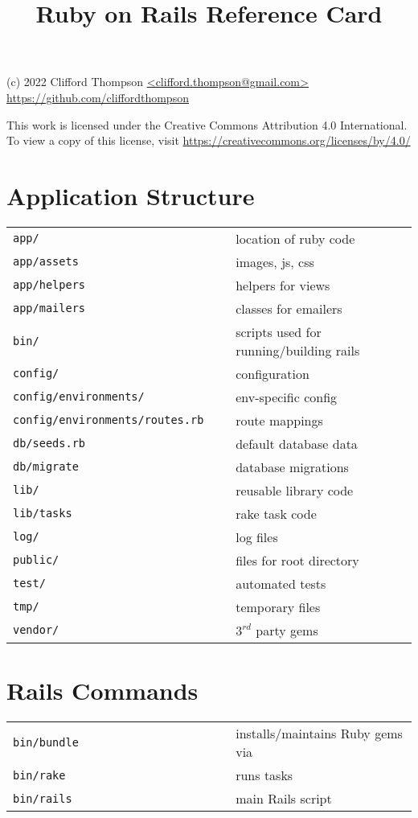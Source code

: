 \documentclass[6pt]{article}
\begin{document}
\raggedright
\footnotesize
\begin{multicols}{3}

  \title{Ruby on Rails Reference Card}

  {\scriptsize
    (c) 2022 Clifford Thompson \url{<clifford.thompson@gmail.com>}\\
    \url{https://github.com/cliffordthompson}

    This work is licensed under the Creative Commons Attribution 4.0 International.
    To view a copy of this license, visit
    \url{https://creativecommons.org/licenses/by/4.0/}
  }

  \section{Application Structure}
  \begin{tabular}{L{0.55\linewidth} L{0.45\linewidth}}
    \tt app/ & location of ruby code \\
    \tt app/assets &  images, js, css \\
    \tt app/helpers &  helpers for views \\
    \tt app/mailers &  classes for emailers \\
    \tt bin/ & scripts used for running/building rails \\
    \tt config/ & configuration \\
    \tt config/environments/ & env-specific config \\
    \tt config/environments/routes.rb & route mappings \\
    \tt db/seeds.rb & default database data\\
    \tt db/migrate & database migrations\\
    \tt lib/ & reusable library code\\
    \tt lib/tasks & rake task code\\
    \tt log/ & log files\\
    \tt public/ & files for root directory \\
    \tt test/ & automated tests \\
    \tt tmp/ & temporary files\\
    \tt vendor/ & $3^{rd}$ party gems\\
  \end{tabular}

  \section{Rails Commands}
  \begin{tabular}{L{0.55\linewidth} L{0.45\linewidth}}
    \tt bin/bundle & installs/maintains Ruby gems via \\
    \tt bin/rake & runs tasks\\
    \tt bin/rails & main Rails script\\
  \end{tabular}

\end{multicols}
\end{document}
